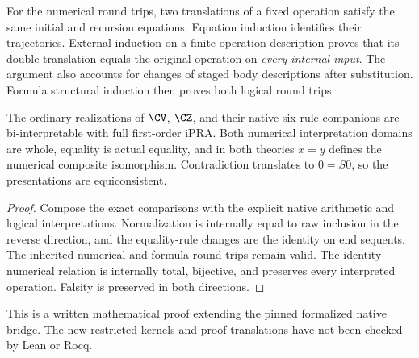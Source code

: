 For the numerical round trips, two translations of a fixed operation
satisfy the same initial and recursion equations. Equation induction
identifies their trajectories. External induction on a finite operation
description proves that its double translation equals the original
operation on \emph{every internal input}. The argument also accounts for
changes of staged body descriptions after substitution.
Formula structural induction then proves both logical round trips.

\begin{theorem}
The ordinary realizations of $\CV$, $\CZ$, and their native six-rule
companions are bi-interpretable with full first-order iPRA.
Both numerical interpretation domains are whole, equality is actual
equality, and in both theories $x=y$ defines the numerical composite
isomorphism. Contradiction translates to $0=S0$, so the presentations
are equiconsistent.
\end{theorem}
\begin{proof}
Compose the exact comparisons with the explicit native arithmetic and
logical interpretations. Normalization is internally equal to raw
inclusion in the reverse direction, and the equality-rule changes are
the identity on end sequents. The inherited numerical and formula
round trips remain valid. The identity numerical relation is internally
total, bijective, and preserves every interpreted operation.
Falsity is preserved in both directions.
\end{proof}

This is a written mathematical proof extending the pinned formalized native
bridge. The new restricted kernels and proof translations have not been
checked by Lean or Rocq.

